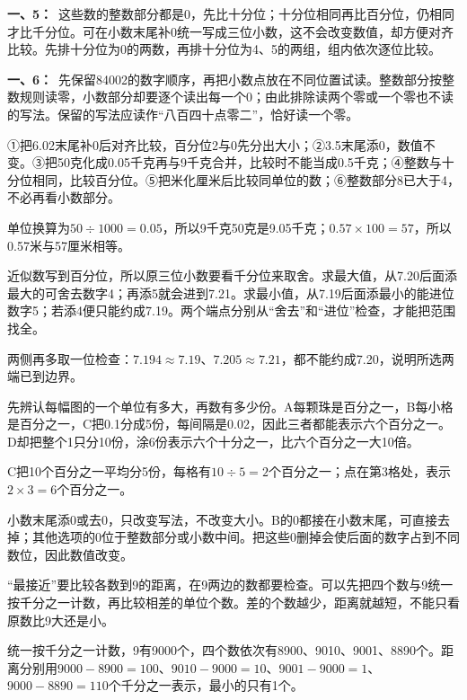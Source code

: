 \documentclass[multi=snippet,border=0pt]{standalone}
\newenvironment{snippet}[3]{\begin{minipage}{#1bp}\color{answerred}\fontsize{#2}{#3}\selectfont\raggedright}{\end{minipage}}
\begin{document}
\begin{snippet}{505}{11.5}{14}\textbf{一、5：}\ 这些数的整数部分都是0，先比十分位；十分位相同再比百分位，仍相同才比千分位。可在小数末尾补0统一写成三位小数，这不会改变数值，却方便对齐比较。先排十分位为0的两数，再排十分位为4、5的两组，组内依次逐位比较。\end{snippet}
\begin{snippet}{505}{11.5}{14}\textbf{一、6：}\ 先保留84002的数字顺序，再把小数点放在不同位置试读。整数部分按整数规则读零，小数部分却要逐个读出每一个0；由此排除读两个零或一个零也不读的写法。保留的写法应读作“八百四十点零二”，恰好读一个零。\end{snippet}
\begin{snippet}{505}{11.5}{14}①把6.02末尾补0后对齐比较，百分位2与0先分出大小；②3.5末尾添0，数值不变。③把50克化成0.05千克再与9千克合并，比较时不能当成0.5千克；④整数与十分位相同，比较百分位。⑤把米化厘米后比较同单位的数；⑥整数部分8已大于4，不必再看小数部分。\par 单位换算为\(50\div1000=0.05\)，所以9千克50克是9.05千克；\(0.57\times100=57\)，所以0.57米与57厘米相等。\end{snippet}
\begin{snippet}{505}{11.5}{14}近似数写到百分位，所以原三位小数要看千分位来取舍。求最大值，从7.20后面添最大的可舍去数字4；再添5就会进到7.21。求最小值，从7.19后面添最小的能进位数字5；若添4便只能约成7.19。两个端点分别从“舍去”和“进位”检查，才能把范围找全。\par 两侧再多取一位检查：\(7.194\approx7.19\)、\(7.205\approx7.21\)，都不能约成7.20，说明所选两端已到边界。\end{snippet}
\begin{snippet}{505}{11.5}{14}先辨认每幅图的一个单位有多大，再数有多少份。A每颗珠是百分之一，B每小格是百分之一，C把0.1分成5份，每间隔是0.02，因此三者都能表示六个百分之一。D却把整个1只分10份，涂6份表示六个十分之一，比六个百分之一大10倍。\par C把10个百分之一平均分5份，每格有\(10\div5=2\)个百分之一；点在第3格处，表示\(2\times3=6\)个百分之一。\end{snippet}
\begin{snippet}{505}{11.5}{14}小数末尾添0或去0，只改变写法，不改变大小。B的0都接在小数末尾，可直接去掉；其他选项的0位于整数部分或小数中间。把这些0删掉会使后面的数字占到不同数位，因此数值改变。\end{snippet}
\begin{snippet}{505}{11.5}{14}“最接近”要比较各数到9的距离，在9两边的数都要检查。可以先把四个数与9统一按千分之一计数，再比较相差的单位个数。差的个数越少，距离就越短，不能只看原数比9大还是小。\par 统一按千分之一计数，9有9000个，四个数依次有8900、9010、9001、8890个。距离分别用\(9000-8900=100\)、\(9010-9000=10\)、\(9001-9000=1\)、\(9000-8890=110\)个千分之一表示，最小的只有1个。\end{snippet}
\end{document}
